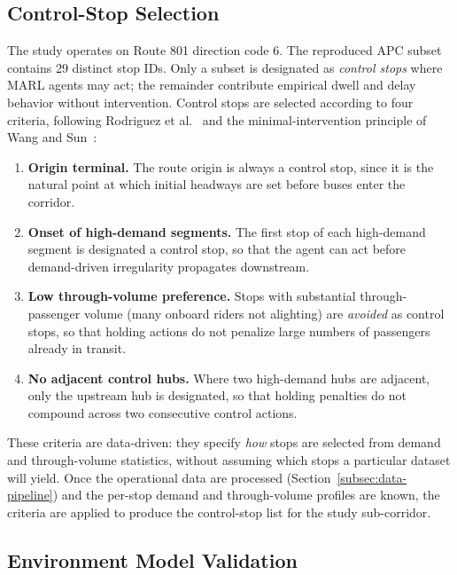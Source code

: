 \subsection{Control-Stop Selection}
\label{subsec:control-stop-selection}

The study operates on Route 801 direction code 6. The reproduced APC subset contains 29 distinct stop IDs. Only a subset is designated as \textit{control stops} where MARL agents may act; the remainder contribute empirical dwell and delay behavior without intervention. Control stops are selected according to four criteria, following Rodriguez et al.~\cite{Rodriguez2023Cooperative} and the minimal-intervention principle of Wang and Sun~\cite{Wangsun}:

\begin{enumerate}
    \item \textbf{Origin terminal.} The route origin is always a control stop, since it is the natural point at which initial headways are set before buses enter the corridor.
    \item \textbf{Onset of high-demand segments.} The first stop of each high-demand segment is designated a control stop, so that the agent can act before demand-driven irregularity propagates downstream.
    \item \textbf{Low through-volume preference.} Stops with substantial through-passenger volume (many onboard riders not alighting) are \textit{avoided} as control stops, so that holding actions do not penalize large numbers of passengers already in transit.
    \item \textbf{No adjacent control hubs.} Where two high-demand hubs are adjacent, only the upstream hub is designated, so that holding penalties do not compound across two consecutive control actions.
\end{enumerate}

These criteria are data-driven: they specify \textit{how} stops are selected from demand and through-volume statistics, without assuming which stops a particular dataset will yield. Once the operational data are processed (Section~\ref{subsec:data-pipeline}) and the per-stop demand and through-volume profiles are known, the criteria are applied to produce the control-stop list for the study sub-corridor.

\subsection{Environment Model Validation}

